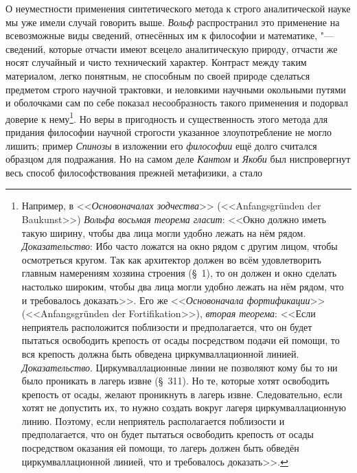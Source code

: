 О неуместности применения синтетического метода к строго
аналитической науке мы уже имели случай говорить выше.
{\em Вольф} распространил
это применение на всевозможные виды сведений, отнесённых им к философии и
математике, "--- сведений, которые отчасти имеют всецело
аналитическую природу, отчасти же носят случайный и чисто технический
характер. Контраст между таким материалом, легко понятным, не способным по
своей природе сделаться предметом строго научной трактовки, и неловкими
научными окольными путями и оболочками сам по себе показал
несообразность такого применения и подорвал доверие к
нему\footnote{Например, в <<{\em Основоначалах зодчества}>>
(<<Anfangs\-gründen der Bau\-kunst>>) {\em Вольфа восьмая теорема гласит}:
<<Окно должно иметь такую ширину, чтобы два лица
могли удобно лежать на нём рядом. {\em Доказательство}:
Ибо часто ложатся на окно рядом с другим лицом, чтобы
осмотреться кругом. Так как архитектор должен во всём удовлетворить главным
намерениям хозяина строения (\S~1), то он должен и окно сделать настолько
широким, чтобы два лица могли удобно лежать на нём рядом, что и требовалось
доказать>>. Его же <<{\em Основоначала фортификации}>>
(<<Anfangs\-grün\-den der For\-tifika\-tion>>), {\em вторая теорема}:
<<Если неприятель расположится поблизости и предполагается,
что он будет пытаться освободить крепость от осады посредством подачи ей
помощи, то вся крепость должна быть обведена циркумваллационной
линией. {\em Доказательство}.
Циркумваллационные линии не позволяют кому бы то ни было
проникать в лагерь извне (\S~311). Но те, которые хотят освободить крепость
от осады, желают проникнуть в лагерь извне. Следовательно, если хотят не
допустить их, то нужно создать вокруг лагеря циркумваллационную линию.
Поэтому, если неприятель располагается поблизости и предполагается, что он
будет пытаться освободить крепость от осады посредством оказания ей помощи,
то лагерь должен быть обведён циркумваллационной линией, что и требовалось
доказать>>.}. Но веры в пригодность и существенность этого
метода для придания философии научной строгости указанное злоупотребление
не могло лишить; пример {\em Спинозы}
в изложении его
{\em философии} ещё долго
считался образцом для подражания. Но на самом деле
{\em Кантом} и
{\em Якоби} был
ниспровергнут весь способ философствования прежней метафизики, а стало
